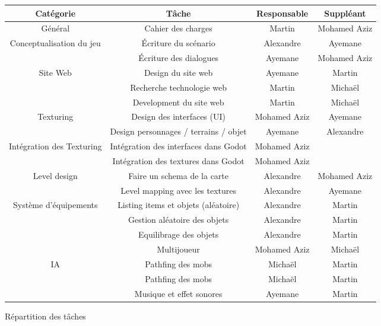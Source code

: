 \begin{figure}[H]
    \centering
    \begin{tabular}{|c|c|c|c|}
        \hline
        \bfseries{Cat\'egorie} & \bfseries{T\^ache} & \bfseries{Responsable} & \bfseries{Suppl\'eant} \\
        \hline\hline
        G\'en\'eral & Cahier des charges & Martin & Mohamed Aziz \\
        \hline\hline
        \multirow{2}{*}{Conceptualisation du jeu} & \'Ecriture du sc\'enario & Alexandre & Ayemane \\
        \cline{2-4}
        & \'Ecriture des dialogues & Ayemane & Mohamed Aziz \\
        \hline\hline
        \multirow{3}{*}{Site Web} & Design du site web & Ayemane & Martin \\
        \cline{2-4}
        & Recherche technologie web & Martin & Michaël \\
        \cline{2-4}
        & Development du site web & Martin & Michaël \\
        \hline\hline
        \multirow{2}{*}{Texturing} & Design des interfaces (UI) & Mohamed Aziz & Ayemane \\
        \cline{2-4}
        & Design personnages / terrains / objet & Ayemane & Alexandre \\
        \hline\hline
        \multirow{2}{*}{Intégration des Texturing} & Int\'egration des interfaces dans Godot & Mohamed Aziz &  \\
        \cline{2-4}
        & Int\'egration des textures dans Godot & Mohamed Aziz & \\
        \hline\hline
        \multirow{2}{*}{Level design} & Faire un schema de la carte & Alexandre & Mohamed Aziz \\
        \cline{2-4}
        &Level mapping avec les textures & Alexandre & Ayemane \\
        \hline\hline
        \multirow{3}{*}{Système d'équipements} & Listing items et objets (al\'eatoire) & Alexandre & Martin \\
        \cline{2-4}
        & Gestion al\'eatoire des objets & Alexandre & Martin \\
        \cline{2-4}
        & Equilibrage des objets & Alexandre & Martin \\
        \hline\hline
        & Multijoueur & Mohamed Aziz & Michaël \\
        \hline\hline
        \multirow{2}{*}{IA} & Pathfing des mobs & Michaël & Martin \\
        \cline{2-4}
        & Pathfing des mobs & Michaël & Martin \\
        \hline\hline
        & Musique et effet sonores & Ayemane & Martin \\
        \hline


    \end{tabular}
    \caption{R\'epartition des tâches}
    \label{fig:repartition_des_taches}
\end{figure}


